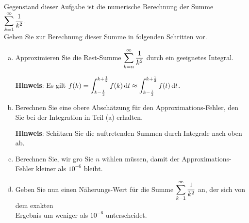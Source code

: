 \exercise
Gegenstand dieser Aufgabe ist die numerische Berechnung der Summe
\\[0.2cm]
\hspace*{1.3cm}
 $\displaystyle \sum\limits_{k=1}^\infty \frac{1}{k^2}$.
\\[0.2cm]
Gehen  Sie zur Berechnung dieser Summe in folgenden Schritten vor.
\begin{enumerate}[(a)]
\item Approximieren Sie die Rest-Summe $\displaystyle\sum\limits_{k=n}^\infty \frac{1}{k^2}$ 
      durch ein geeignetes Integral.

      \textbf{Hinweis}: Es gilt $\displaystyle f(k) = \int_{k-\frac{1}{2}}^{k+\frac{1}{2}} f(k) \, \textrm{d} t \approx \int_{k-\frac{1}{2}}^{k+\frac{1}{2}} f(t) \, \textrm{d} t$.
\item Berechnen Sie eine obere Absch\"atzung f\"ur den Approximations-Fehler,
      den Sie bei der Integration in Teil (a) erhalten.
      
      \textbf{Hinweis}: Sch\"atzen Sie die auftretenden Summen durch Integrale nach oben ab.
\item Berechnen Sie, wir gro\3 Sie $n$ w\"ahlen m\"ussen, damit der Approximations-Fehler
      kleiner als $10^{-6}$ bleibt.
\item Geben Sie nun einen N\"aherungs-Wert f\"ur die Summe $\displaystyle\sum\limits_{k=1}^\infty \frac{1}{k^2}$ an,
      der sich von dem exakten \\[-0.2cm]
      Ergebnis um weniger als $10^{-6}$ unterscheidet.
\end{enumerate}



